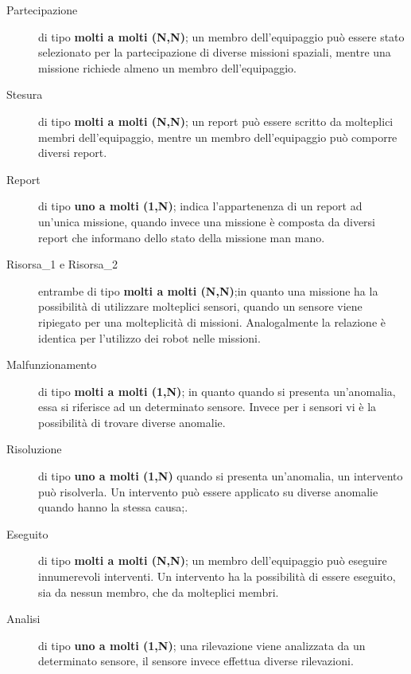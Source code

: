 \begin{description}
\item[Partecipazione] di tipo \textbf{molti a molti (N,N)}; un membro
  dell'equipaggio può essere stato selezionato per la partecipazione
  di diverse missioni spaziali, mentre una missione richiede almeno un
  membro dell'equipaggio.
\item[Stesura] di tipo \textbf{molti a molti (N,N)}; un report può
  essere scritto da molteplici membri dell'equipaggio, mentre un
  membro dell'equipaggio può comporre diversi report.
\item[Report] di tipo \textbf{uno a molti (1,N)}; indica
  l'appartenenza di un report ad un'unica missione, quando invece una
  missione è composta da diversi report che informano dello stato
  della missione man mano.
\item[Risorsa\_1 e Risorsa\_2] entrambe di tipo \textbf{molti a molti
  (N,N)};in quanto una missione ha la possibilità di utilizzare
  molteplici sensori, quando un sensore viene ripiegato per una
  molteplicità di missioni. Analogalmente la relazione è identica per
  l'utilizzo dei robot nelle missioni.
\item[Malfunzionamento] di tipo \textbf{molti a molti (1,N)};
  in quanto quando si presenta un'anomalia, essa si riferisce ad un
  determinato sensore. Invece per i sensori vi è la possibilità di
  trovare diverse anomalie.
\item[Risoluzione] di tipo \textbf{uno a molti (1,N)} quando
  si presenta un'anomalia, un intervento può risolverla. Un intervento
  può essere applicato su diverse anomalie quando hanno la stessa
  causa;.
\item[Eseguito] di tipo \textbf{molti a molti (N,N)}; un
  membro dell'equipaggio può eseguire innumerevoli interventi. Un
  intervento ha la possibilità di essere eseguito, sia da nessun
  membro, che da molteplici membri.
\item[Analisi] di tipo \textbf{uno a molti (1,N)}; una
  rilevazione viene analizzata da un determinato sensore, il sensore
  invece effettua diverse rilevazioni.
\end{description}

